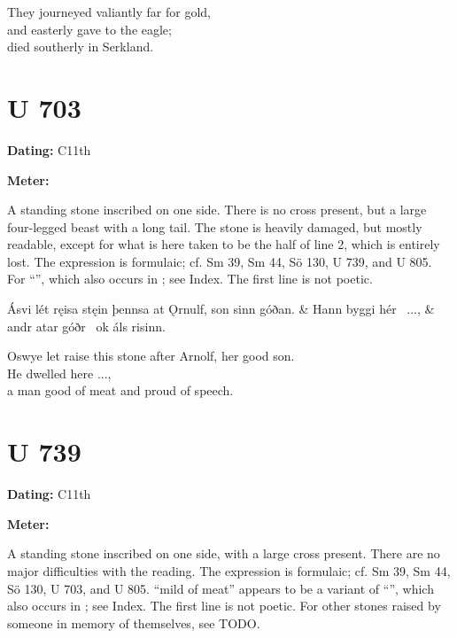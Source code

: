 \bvb They journeyed valiantly far for gold, \\
and easterly gave to the eagle; \\
died southerly in Serkland.\evb\evg

\sectionline

\section{U 703}

\begin{flushright}%
\textbf{Dating:} C11th

\textbf{Meter:} \Fornyrdislag
\end{flushright}%

A standing stone inscribed on one side.  There is no cross present, but a large four-legged beast with a long tail.  The stone is heavily damaged, but mostly readable, except for what is here taken to be the half of line 2, which is entirely lost.  The expression is formulaic; cf. Sm 39, Sm 44, Sö 130, U 739, and U 805.  For “”, which also occurs in \Havamal; see Index.  The first line is not poetic.

\sectionline

\bvg\bva[]%
Ásvi lét ręisa stęin þennsa at Ǫrnulf, son sinn góðan. &
Hann byggi hér \hld\ ..., &
andr atar góðr \hld\ ok áls risinn.\eva

\bvb Oswye let raise this stone after Arnolf, her good son. \\
He dwelled here ..., \\
a man good of meat and proud of speech.\evb\evg

\sectionline

\section{U 739}

\begin{flushright}%
\textbf{Dating:} C11th

\textbf{Meter:} \Fornyrdislag
\end{flushright}%

A standing stone inscribed on one side, with a large cross present.  There are no major difficulties with the reading.  The expression is formulaic; cf. Sm 39, Sm 44, Sö 130, U 703, and U 805.  “mild of meat” appears to be a variant of “”, which also occurs in \Havamal; see Index.  The first line is not poetic.  For other stones raised by someone in memory of themselves, see TODO.

